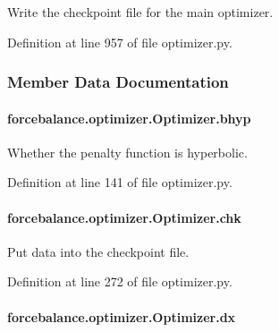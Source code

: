 Write the checkpoint file for the main optimizer. 



Definition at line 957 of file optimizer.\-py.



\subsubsection{Member Data Documentation}
\hypertarget{classforcebalance_1_1optimizer_1_1Optimizer_a83d94779674511a9d31b780b07ea54fb}{
\paragraph[{bhyp}]{\setlength{\rightskip}{0pt plus 5cm}forcebalance.\-optimizer.\-Optimizer.\-bhyp}}\label{classforcebalance_1_1optimizer_1_1Optimizer_a83d94779674511a9d31b780b07ea54fb}


Whether the penalty function is hyperbolic. 



Definition at line 141 of file optimizer.\-py.

\hypertarget{classforcebalance_1_1optimizer_1_1Optimizer_aab04585adf73123d3187aa7dd22e7ce2}{
\paragraph[{chk}]{\setlength{\rightskip}{0pt plus 5cm}forcebalance.\-optimizer.\-Optimizer.\-chk}}\label{classforcebalance_1_1optimizer_1_1Optimizer_aab04585adf73123d3187aa7dd22e7ce2}


Put data into the checkpoint file. 



Definition at line 272 of file optimizer.\-py.

\hypertarget{classforcebalance_1_1optimizer_1_1Optimizer_aaa9b39385a4d067aec12a595da09cc16}{
\paragraph[{dx}]{\setlength{\rightskip}{0pt plus 5cm}forcebalance.\-optimizer.\-Optimizer.\-dx}}\label{classforcebalance_1_1optimizer_1_1Optimizer_aaa9b39385a4d067aec12a595da09cc16}


